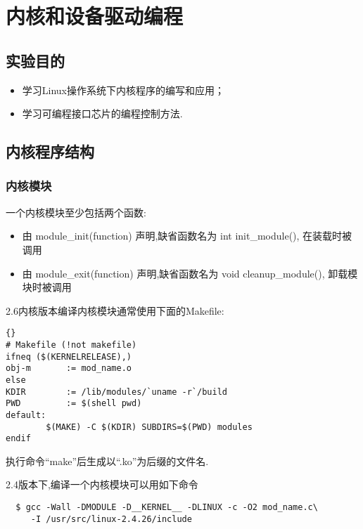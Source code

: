 \chapter{内核和设备驱动编程}

\section{实验目的}
\begin{itemize}\itemsep=-3pt
  \item 学习Linux操作系统下内核程序的编写和应用；
  \item 学习可编程接口芯片的编程控制方法.
\end{itemize}

\section{内核程序结构}
\subsection{内核模块}	
	一个内核模块至少包括两个函数:
\begin{itemize}\itemsep=-3pt
  \item 由 module\_init(function) 声明,缺省函数名为 int init\_module(),
		在装载时被调用
  \item 由 module\_exit(function) 声明,缺省函数名为 void cleanup\_module(),
		卸载模块时被调用
\end{itemize}

    2.6内核版本编译内核模块通常使用下面的Makefile:

\begin{boxedminipage}{.9\textwidth}
\lstset{language=make}
\begin{lstlisting}{}
# Makefile (!not makefile)
ifneq ($(KERNELRELEASE),)
obj-m       := mod_name.o
else
KDIR        := /lib/modules/`uname -r`/build
PWD         := $(shell pwd)
default:
        $(MAKE) -C $(KDIR) SUBDIRS=$(PWD) modules
endif
\end{lstlisting}
\end{boxedminipage}

执行命令``make''后生成以``.ko''为后缀的文件名.

	2.4版本下,编译一个内核模块可以用如下命令

\begin{boxedminipage}{.9\textwidth}
\begin{verbatim}
  $ gcc -Wall -DMODULE -D__KERNEL__ -DLINUX -c -O2 mod_name.c\
     -I /usr/src/linux-2.4.26/include
\end{verbatim}
\end{boxedminipage}

